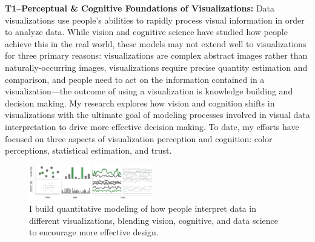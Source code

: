 \documentclass[11pt]{article}
\begin{document}
\textbf{T1--Perceptual \& Cognitive Foundations of Visualizations: }
Data visualizations use people's abilities to rapidly process visual information in order to analyze data. While vision and cognitive science have studied how people achieve this in the real world, these models may not extend well to visualizations for three primary reasons: visualizations are complex abstract images rather than naturally-occurring images, visualizations require precise quantity estimation and comparison, and people need to act on the information contained in a visualization---the outcome of using a visualization is knowledge building and decision making. My research explores how vision and cognition shifts in visualizations with the ultimate goal of modeling processes involved in visual data interpretation to drive more effective decision making. To date, my efforts have focused on three aspects of visualization perception and cognition: color perceptions, statistical estimation, and trust. 

\begin{figure}
	\begin{center}
		\includegraphics[width=0.48\textwidth]{teaserOne.pdf}
	\end{center}
	\caption{I build quantitative modeling of how people interpret data in different visualizations, blending vision, cognitive, and data science to encourage more effective design.}
\end{figure}
\end{document}
